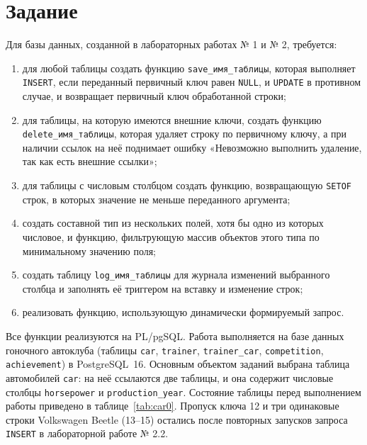\documentclass[oneside,a4paper,14pt]{extarticle}
\begin{document}
\section{Задание}

Для базы данных, созданной в лабораторных работах № 1 и № 2, требуется:

\begin{enumerate}
    \item для любой таблицы создать функцию \texttt{save\_имя\_таблицы}, которая выполняет \texttt{INSERT}, если переданный первичный ключ равен \texttt{NULL}, и \texttt{UPDATE} в противном случае, и возвращает первичный ключ обработанной строки;
    \item для таблицы, на которую имеются внешние ключи, создать функцию \texttt{delete\_имя\_таблицы}, которая удаляет строку по первичному ключу, а при наличии ссылок на неё поднимает ошибку «Невозможно выполнить удаление, так как есть внешние ссылки»;
    \item для таблицы с числовым столбцом создать функцию, возвращающую \texttt{SETOF} строк, в которых значение не меньше переданного аргумента;
    \item создать составной тип из нескольких полей, хотя бы одно из которых числовое, и функцию, фильтрующую массив объектов этого типа по минимальному значению поля;
    \item создать таблицу \texttt{log\_имя\_таблицы} для журнала изменений выбранного столбца и заполнять её триггером на вставку и изменение строк;
    \item реализовать функцию, использующую динамически формируемый запрос.
\end{enumerate}

Все функции реализуются на PL/pgSQL. Работа выполняется на базе данных гоночного автоклуба (таблицы \texttt{car}, \texttt{trainer}, \texttt{trainer\_car}, \texttt{competition}, \texttt{achievement}) в PostgreSQL~16. Основным объектом заданий выбрана таблица автомобилей \texttt{car}: на неё ссылаются две таблицы, и она содержит числовые столбцы \texttt{horsepower} и \texttt{production\_year}. Состояние таблицы перед выполнением работы приведено в таблице~\ref{tab:car0}. Пропуск ключа 12 и три одинаковые строки Volkswagen Beetle (13--15) остались после повторных запусков запроса \texttt{INSERT} в лабораторной работе № 2.2.
\end{document}
